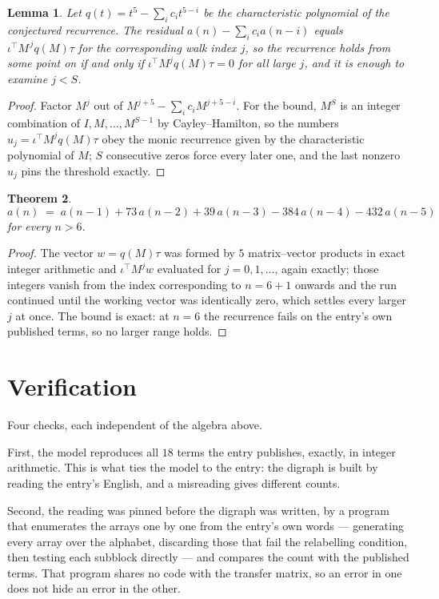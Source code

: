 \documentclass[11pt,a4paper]{article}
\theoremstyle{plain}
\newtheorem{theorem}{Theorem}
\newtheorem{lemma}[theorem]{Lemma}
\theoremstyle{definition}
\begin{document}
\begin{lemma}\label{lem:crit}
Let $q(t)=t^{5}-\sum_i c_it^{5-i}$ be the characteristic polynomial of the
conjectured recurrence. The residual $a(n)-\sum_ic_ia(n-i)$ equals
$\iota^{\!\top}M^{\,j}q(M)\tau$ for the corresponding walk index $j$, so the recurrence
holds from some point on if and only if $\iota^{\!\top}M^{j}q(M)\tau=0$ for all large $j$,
and it is enough to examine $j<S$.
\end{lemma}

\begin{proof}
Factor $M^{j}$ out of $M^{j+5}-\sum_ic_iM^{j+5-i}$. For the bound, $M^{S}$
is an integer combination of $I,M,\dots,M^{S-1}$ by Cayley--Hamilton, so the numbers
$u_j=\iota^{\!\top}M^{j}q(M)\tau$ obey the monic recurrence given by the characteristic
polynomial of $M$; $S$ consecutive zeros force every later one, and the last nonzero $u_j$
pins the threshold exactly.
\end{proof}

\begin{theorem}
\[
a(n)\;=\;a(n-1) + 73\,a(n-2) + 39\,a(n-3) - 384\,a(n-4) - 432\,a(n-5)
\]
for every $n>6$.
\end{theorem}

\begin{proof}
The vector $w=q(M)\tau$ was formed by $5$ matrix--vector products in exact integer
arithmetic and $\iota^{\!\top}M^{j}w$ evaluated for $j=0,1,\dots$, again exactly; those
integers vanish from the index corresponding to $n=6+1$ onwards and the run continued
until the working vector was identically zero, which settles every larger $j$ at once. The bound is exact: at $n=6$ the recurrence fails on the entry's own published terms, so no larger range holds.
\end{proof}

\section{Verification}

Four checks, each independent of the algebra above.

First, the model reproduces all $18$ terms the entry publishes, exactly, in integer
arithmetic. This is what ties the model to the entry: the digraph is built by reading the
entry's English, and a misreading gives different counts.

Second, the reading was pinned before the digraph was written, by a program that enumerates
the arrays one by one from the entry's own words --- generating every array over the
alphabet, discarding those that fail the relabelling condition, then testing each subblock
directly --- and compares the count with the published terms. That program shares no code
with the transfer matrix, so an error in one does not hide an error in the other.
\end{document}
